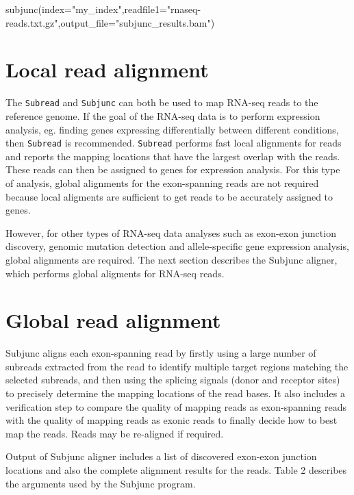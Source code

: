 \documentclass[12pt]{report}
\newcommand{\code}[1]{{\small\texttt{#1}}}
\newcommand{\Subjunc}{\textsf{Subjunc}}
\begin{document}
\begin{Rcode}
subjunc(index="my_index",readfile1="rnaseq-reads.txt.gz",output_file="subjunc_results.bam")
\end{Rcode}


\section{Local read alignment}

The \code{Subread} and \code{Subjunc} can both be used to map RNA-seq reads to the reference genome.
If the goal of the RNA-seq data is to perform expression analysis, eg. finding genes expressing differentially between different conditions, then \code{Subread} is recommended.
\code{Subread} performs fast local alignments for reads and reports the mapping locations that have the largest overlap with the reads.
These reads can then be assigned to genes for expression analysis.
For this type of analysis, global alignments for the exon-spanning reads are not required because local aligments are sufficient to get reads to be accurately assigned to genes.

However, for other types of RNA-seq data analyses such as exon-exon junction discovery, genomic mutation detection and allele-specific gene expression analysis, global alignments are required.
The next section describes the {\Subjunc} aligner, which performs global aligments for RNA-seq reads.
 
\section{Global read alignment}

{\Subjunc} aligns each exon-spanning read by firstly using a large number of subreads extracted from the read to identify multiple target regions matching the selected subreads, and then using the splicing signals (donor and receptor sites) to precisely determine the mapping locations of the read bases.
It also includes a verification step to compare the quality of mapping reads as exon-spanning reads with the quality of mapping reads as exonic reads to finally decide how to best map the reads.
Reads may be re-aligned if required.

Output of {\Subjunc} aligner includes a list of discovered exon-exon junction locations and also the complete alignment results for the reads.
Table 2 describes the arguments used by the {\Subjunc} program.\\
\end{document}
